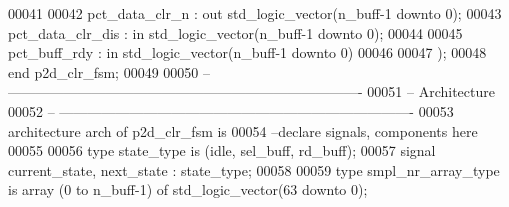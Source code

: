 \begin{DoxyCode}
00041      
00042       \textcolor{vhdlchar}{pct_data_clr_n}       \textcolor{vhdlchar}{:} \textcolor{keywordflow}{out} \textcolor{comment}{std\_logic\_vector}\textcolor{vhdlchar}{(}\textcolor{vhdlchar}{n_buff}\textcolor{vhdlchar}{-}\textcolor{vhdllogic}{}\textcolor{vhdllogic}{1} \textcolor{keywordflow}{downto} \textcolor{vhdllogic}{}\textcolor{vhdllogic}{0}\textcolor{vhdlchar}{)};
00043       \textcolor{vhdlchar}{pct_data_clr_dis}     \textcolor{vhdlchar}{:} \textcolor{keywordflow}{in} \textcolor{comment}{std\_logic\_vector}\textcolor{vhdlchar}{(}\textcolor{vhdlchar}{n_buff}\textcolor{vhdlchar}{-}\textcolor{vhdllogic}{}\textcolor{vhdllogic}{1} \textcolor{keywordflow}{downto} \textcolor{vhdllogic}{}\textcolor{vhdllogic}{0}\textcolor{vhdlchar}{)};
00044 
00045       \textcolor{vhdlchar}{pct_buff_rdy}         \textcolor{vhdlchar}{:} \textcolor{keywordflow}{in} \textcolor{comment}{std\_logic\_vector}\textcolor{vhdlchar}{(}\textcolor{vhdlchar}{n_buff}\textcolor{vhdlchar}{-}\textcolor{vhdllogic}{}\textcolor{vhdllogic}{1} \textcolor{keywordflow}{downto} \textcolor{vhdllogic}{}\textcolor{vhdllogic}{0}\textcolor{vhdlchar}{)}   
00046       
00047         \textcolor{vhdlchar}{)};
00048 \textcolor{keywordflow}{end} \textcolor{vhdlchar}{p2d\_clr\_fsm};
00049 
00050 \textcolor{keyword}{-- ----------------------------------------------------------------------------}
00051 \textcolor{keyword}{-- Architecture}
00052 \textcolor{keyword}{-- ----------------------------------------------------------------------------}
00053 \textcolor{keywordflow}{architecture} arch \textcolor{keywordflow}{of} p2d_clr_fsm is
00054 \textcolor{keyword}{--declare signals,  components here}
00055 
00056 \textcolor{keywordflow}{type} \textcolor{vhdlchar}{state_type} \textcolor{keywordflow}{is} \textcolor{vhdlchar}{(}\textcolor{vhdlchar}{idle}\textcolor{vhdlchar}{,} \textcolor{vhdlchar}{sel\_buff}\textcolor{vhdlchar}{,} \textcolor{vhdlchar}{rd\_buff}\textcolor{vhdlchar}{)};
00057 \textcolor{keywordflow}{signal} \textcolor{vhdlchar}{current_state}\textcolor{vhdlchar}{,} \textcolor{vhdlchar}{next_state} \textcolor{vhdlchar}{:} \textcolor{vhdlchar}{state_type}; 
00058 
00059 \textcolor{keywordflow}{type} \textcolor{vhdlchar}{smpl_nr_array_type}  \textcolor{keywordflow}{is} \textcolor{keywordflow}{array} \textcolor{vhdlchar}{(}\textcolor{vhdllogic}{}\textcolor{vhdllogic}{0} \textcolor{keywordflow}{to} \textcolor{vhdlchar}{n_buff}\textcolor{vhdlchar}{-}\textcolor{vhdllogic}{}\textcolor{vhdllogic}{1}\textcolor{vhdlchar}{)} \textcolor{keywordflow}{of} \textcolor{comment}{std\_logic\_vector}\textcolor{vhdlchar}{(}\textcolor{vhdllogic}{}\textcolor{vhdllogic}{63} \textcolor{keywordflow}{downto} \textcolor{vhdllogic}{}\textcolor{vhdllogic}{0}\textcolor{vhdlchar}{)};  

\end{DoxyCode}
